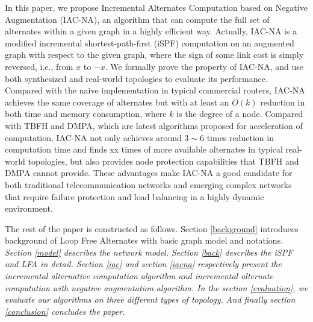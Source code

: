 In this paper, we propose Incremental Alternates Computation based on Negative
Augmentation (IAC-NA), an algorithm that can
compute the full set of alternates within a given graph in a highly efficient way.
Actually, IAC-NA is a modified incremental shortest-path-first (iSPF) computation
on an augmented graph with respect to the given graph, where the sign of some link cost
is simply reversed, i.e., from $x$ to $-x$. We formally prove the property of IAC-NA,
and use both synthesized and real-world topologies to evaluate its performance.
Compared with the naive implementation in typical commercial routers, IAC-NA achieves the same coverage of alternates but
with at least an $O(k)$ reduction in both time and memory consumption, where $k$ is the degree of a node.
Compared with TBFH and DMPA, which are latest algorithms proposed for acceleration of computation,
IAC-NA not only achieves around $3 \sim 6$ times reduction in computation time
and finds xx times of more available alternates in typical real-world topologies, but also
provides  node protection capabilities that TBFH and DMPA cannot provide.
These advantages make IAC-NA a good candidate for both traditional telecommunication networks
and emerging complex networks that require failure protection and load balancing
in a highly dynamic environment.
\iffalse
Our contributions are summarized as follows:
\begin{itemize}
\item We propose an incremental alternates computation (IAC) algorithm based on iSPF, which can compute all the next hops satisfied DC rule. %
\item Theoretical analysis indicates that the computation complexity of IAC is less than that of constructing a shortest path tree and  can provide the same network availability as DC.
\item We propose an IAC-NA algorithm which can  efficiently calculate
the minimum cost of all its neighbors to all other nodes of the
network on the shortest path tree rooted at the compute node. Therefore
IAC-NA can completely and efficiently deal with LFA problem.
\item Theoretical analysis and experiments results indicate that IAC-NA can provide the same network availability as LFA.
\end{itemize}
\fi

The rest of the paper is constructed as follows.
Section \ref{background} introduces background of Loop Free Alternates with basic graph model and notations.
{\em Section \ref{model}  describes the network model.
Section \ref{back} describes the iSPF and LFA in detail.
Section \ref{iac} and section \ref{iacna} respectively present the incremental alternative computation algorithm and incremental alternate computation with negative augmentation algorithm.
In the section \ref{evaluation}, we evaluate our algorithms on three different types of topology.  And finally section \ref{conclusion} concludes the paper.
}



